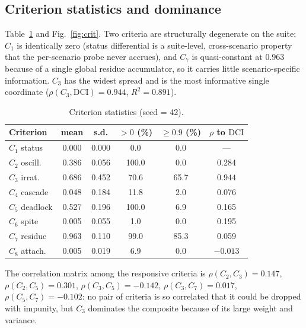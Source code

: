 \documentclass[journal]{IEEEtran}
\newcommand{\DCI}{\mathrm{DCI}}
\begin{document}
\subsection{Criterion statistics and dominance}
Table~\ref{tab:crit} and Fig.~\ref{fig:crit}. Two criteria are
structurally degenerate on the suite: $C_1$ is identically zero (status
differential is a suite-level, cross-scenario property that the
per-scenario probe never accrues), and $C_7$ is quasi-constant at
$0.963$ because of a single global residue accumulator, so it carries
little scenario-specific information. $C_3$ has the widest spread and is
the most informative single coordinate ($\rho(C_3,\DCI)=0.944$,
$R^2=0.891$).

\begin{table}[h]
\centering
\caption{Criterion statistics (seed = 42).}
\label{tab:crit}
\begin{tabular}{lccccc}
\toprule
Criterion & mean & s.d. & $>0$ (\%) & $\ge0.9$ (\%) & $\rho$ to $\DCI$ \\
\midrule
$C_1$ status & 0.000 & 0.000 & 0.0 & 0.0 & --- \\
$C_2$ oscill. & 0.386 & 0.056 & 100.0 & 0.0 & 0.284 \\
$C_3$ irrat. & 0.686 & 0.452 & 70.6 & 65.7 & $0.944$ \\
$C_4$ cascade & 0.048 & 0.184 & 11.8 & 2.0 & 0.076 \\
$C_5$ deadlock & 0.527 & 0.196 & 100.0 & 6.9 & 0.165 \\
$C_6$ spite & 0.005 & 0.055 & 1.0 & 0.0 & 0.195 \\
$C_7$ residue & 0.963 & 0.110 & 99.0 & 85.3 & 0.059 \\
$C_8$ attach. & 0.005 & 0.019 & 6.9 & 0.0 & $-0.013$ \\
\bottomrule
\end{tabular}
\end{table}

The correlation matrix among the responsive criteria is
$\rho(C_2,C_3)=0.147$, $\rho(C_2,C_5)=0.301$, $\rho(C_3,C_5)=-0.142$,
$\rho(C_3,C_7)=0.017$, $\rho(C_5,C_7)=-0.102$: no pair of criteria is
so correlated that it could be dropped with impunity, but $C_3$
dominates the composite because of its large weight and variance.
\end{document}
